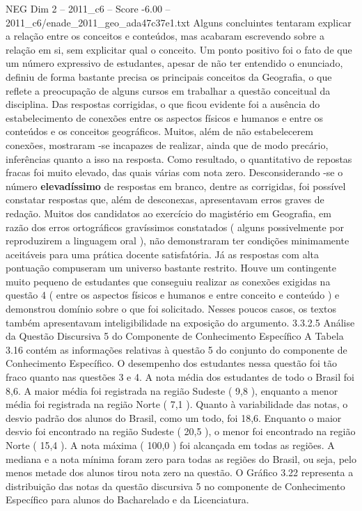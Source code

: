 \begin{textsample}{NEG Dim 2 – 2011\_c6 – Score -6.00 – 2011\_c6/enade\_2011\_geo\_ada47c37e1.txt}
Alguns concluintes tentaram explicar a relação entre os conceitos e conteúdos, mas acabaram escrevendo sobre a relação em si, sem explicitar qual o conceito.
Um ponto positivo foi o fato de que um número expressivo de estudantes, apesar de não ter entendido o enunciado, definiu de forma bastante precisa os principais conceitos da Geografia, o que reflete a preocupação de alguns cursos em trabalhar a questão conceitual da disciplina.
Das respostas corrigidas, o que ficou evidente foi a ausência do estabelecimento de conexões entre os aspectos físicos e humanos e entre os conteúdos e os conceitos geográficos.
Muitos, além de não estabelecerem conexões, mostraram -se incapazes de realizar, ainda que de modo precário, inferências quanto a isso na resposta.
Como resultado, o quantitativo de repostas fracas foi muito elevado, das quais várias com nota zero.
Desconsiderando -se o número \textbf{elevadíssimo} de respostas em branco, dentre as corrigidas, foi possível constatar respostas que, além de desconexas, apresentavam erros graves de redação.
Muitos dos candidatos ao exercício do magistério em Geografia, em razão dos erros ortográficos gravíssimos constatados ( alguns possivelmente por reproduzirem a linguagem oral ), não demonstraram ter condições minimamente aceitáveis para uma prática docente satisfatória.
Já as respostas com alta pontuação compuseram um universo bastante restrito.
Houve um contingente muito pequeno de estudantes que conseguiu realizar as conexões exigidas na questão 4 ( entre os aspectos físicos e humanos e entre conceito e conteúdo ) e demonstrou domínio sobre o que foi solicitado.
Nesses poucos casos, os textos também apresentavam inteligibilidade na exposição do argumento. 3.3.2.5 Análise da Questão Discursiva 5 do Componente de Conhecimento Específico A Tabela 3.16 contém as informações relativas à questão 5 do conjunto do componente de Conhecimento Específico.
O desempenho dos estudantes nessa questão foi tão fraco quanto nas questões 3 e 4.
A nota média dos estudantes de todo o Brasil foi 8,6.
A maior média foi registrada na região Sudeste ( 9,8 ), enquanto a menor média foi registrada na região Norte ( 7,1 ).
Quanto à variabilidade das notas, o desvio padrão dos alunos do Brasil, como um todo, foi 18,6.
Enquanto o maior desvio foi encontrado na região Sudeste ( 20,5 ), o menor foi encontrado na região Norte ( 15,4 ).
A nota máxima ( 100,0 ) foi alcançada em todas as regiões.
A mediana e a nota mínima foram zero para todas as regiões do Brasil, ou seja, pelo menos metade dos alunos tirou nota zero na questão.
O Gráfico 3.22 representa a distribuição das notas da questão discursiva 5 no componente de Conhecimento Específico para alunos do Bacharelado e da Licenciatura.

\end{textsample}
